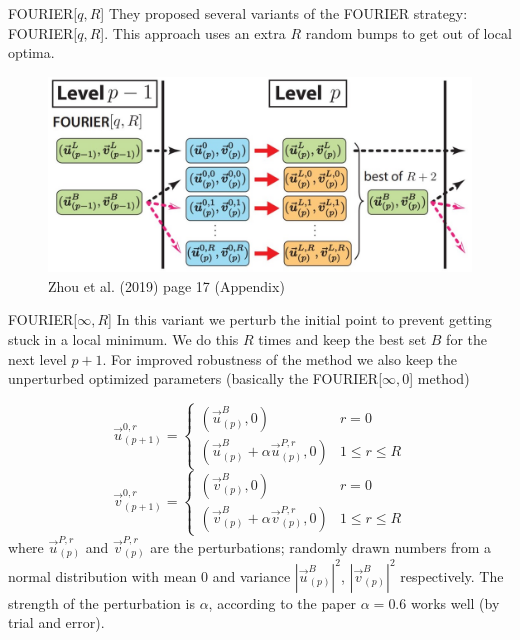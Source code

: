 \documentclass{beamer}
\begin{document}
\begin{frame}{FOURIER[$q,R$]}
	They proposed several variants of the FOURIER strategy: FOURIER[$q,R$]. This approach uses an extra $R$ random bumps to get out of local optima.
	
	\begin{figure}
		\centering
		\includegraphics[scale=0.3]{figures/fourier[q,R].JPG}
		\caption{Zhou et al. (2019) page 17 (Appendix)}
	\end{figure}
\end{frame}

\begin{frame}{FOURIER[$\infty,R$]}
	In this variant we perturb the initial point to prevent getting stuck in a local minimum. We do this $R$ times and keep the best set $B$ for the next level $p+1$. For improved robustness of the method we also keep the unperturbed optimized parameters (basically the FOURIER[$\infty,0$] method)
	
	\begin{equation}
			\vec{u}_{(p+1)}^{0,r} = \begin{cases} 
		(\vec{u}^B_{(p)},0) & r = 0 \\
		(\vec{u}^B_{(p)} + \alpha \vec{u}^{P,r}_{(p)}, 0) & 1 \leq r \leq R
		\end{cases}
	\end{equation}
	\begin{equation}
		\vec{v}_{(p+1)}^{0,r} = \begin{cases} 
		(\vec{v}^B_{(p)},0) & r = 0 \\
		(\vec{v}^B_{(p)} + \alpha \vec{v}^{P,r}_{(p)}, 0) & 1 \leq r \leq R
		\end{cases}
	\end{equation}
	where $\vec{u}^{P,r}_{(p)}$ and $\vec{v}^{P,r}_{(p)}$ are the perturbations; randomly drawn numbers from a normal distribution with mean $0$ and variance $|\vec{u}^{B}_{(p)}|^2$, $|\vec{v}^{B}_{(p)}|^2$  respectively. The strength of the perturbation is $\alpha$, according to the paper $\alpha = 0.6$ works well (by trial and error).
\end{frame}
\end{document}
